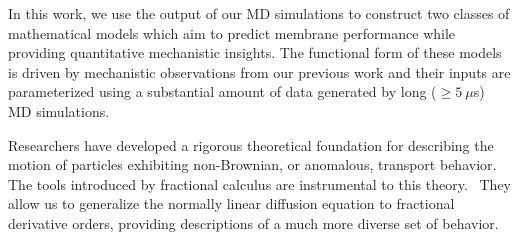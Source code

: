 \documentclass[12pt]{article}
\begin{document}
  In this work, we use the output of our MD simulations to construct two classes of 
  mathematical models which aim to predict membrane performance while providing quantitative 
  mechanistic insights. The functional form of these models is driven by mechanistic 
  observations from our previous work and their inputs are parameterized using a 
  substantial amount of data generated by long ($\geq 5~\mu$s) MD simulations. 
  
%  
  
  Researchers have developed a rigorous theoretical foundation for describing the 
  motion of particles exhibiting non-Brownian, or anomalous, transport behavior.
  \cite{metzler_random_2000,bouchaud_anomalous_1990} The tools introduced by 
  fractional calculus are instrumental to this theory.~\cite{gorenflo_fractional_1997}
  They allow us to generalize the normally linear diffusion equation to fractional
  derivative orders, providing descriptions of a much more diverse set of behavior.~\cite{klages_anomalous_2008}
\end{document}
